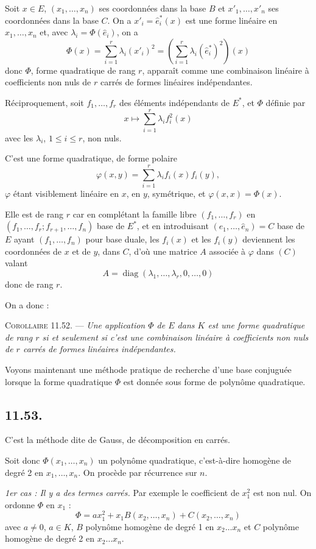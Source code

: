 Soit $x\in E$, $(x_1,\ldots,x_n)$ ses coordonnées dans la base $B$ et $x'_1,\ldots,x'_n$ ses coordonnées dans la base $C$. On a $x'_i=\hat e_i^*(x)$ est une forme linéaire en $x_1,\ldots,x_n$ et, avec $\lambda_i=\Phi(\hat e_i)$, on a
\[
\Phi(x)=\sum_{i=1}^r\lambda_i(x'_i)^2
=\left(\sum_{i=1}^r\lambda_i(\hat e_i^*)^2\right)(x)
\]
donc $\Phi$, forme quadratique de rang $r$, apparaît comme une combinaison linéaire à coefficients non nuls de $r$ carrés de formes linéaires indépendantes.

Réciproquement, soit $f_1,\ldots,f_r$ des éléments indépendants de $E^*$, et $\Phi$ définie par
\[
x\longmapsto\sum_{i=1}^r\lambda_if_i^2(x)
\]
avec les $\lambda_i$, $1\le i\le r$, non nuls.

C'est une forme quadratique, de forme polaire
\[
\varphi(x,y)=\sum_{i=1}^r\lambda_if_i(x)f_i(y),
\]
$\varphi$ étant visiblement linéaire en $x$, en $y$, symétrique, et $\varphi(x,x)=\Phi(x)$.

Elle est de rang $r$ car en complétant la famille libre $(f_1,\ldots,f_r)$ en $(f_1,\ldots,f_r;f_{r+1},\ldots,f_n)$ base de $E^*$, et en introduisant $(\hat e_1,\ldots,\hat e_n)=C$ base de $E$ ayant $(f_1,\ldots,f_n)$ pour base duale, les $f_i(x)$ et les $f_i(y)$ deviennent les coordonnées de $x$ et de $y$, dans $C$, d'où une matrice $A$ associée à $\varphi$ dans $(C)$ valant
\[
A=\operatorname{diag}(\lambda_1,\ldots,\lambda_r,0,\ldots,0)
\]
donc de rang $r$.

On a donc :

\medskip\noindent\textsc{Corollaire 11.52.} --- \emph{Une application $\Phi$ de $E$ dans $K$ est une forme quadratique de rang $r$ si et seulement si c'est une combinaison linéaire à coefficients non nuls de $r$ carrés de formes linéaires indépendantes.}

Voyons maintenant une méthode pratique de recherche d'une base conjuguée lorsque la forme quadratique $\Phi$ est donnée sous forme de polynôme quadratique.

\subsection*{11.53.}
C'est la méthode dite de Gauss, de décomposition en carrés.

Soit donc $\Phi(x_1,\ldots,x_n)$ un polynôme quadratique, c'est-à-dire homogène de degré 2 en $x_1,\ldots,x_n$. On procède par récurrence sur $n$.

\emph{1er cas : Il y a des termes carrés.} Par exemple le coefficient de $x_1^2$ est non nul. On ordonne $\Phi$ en $x_1$ :
\[
\Phi=ax_1^2+x_1B(x_2,\ldots,x_n)+C(x_2,\ldots,x_n)
\]
avec $a\ne0$, $a\in K$, $B$ polynôme homogène de degré 1 en $x_2\ldots x_n$ et $C$ polynôme homogène de degré 2 en $x_2\ldots x_n$.

